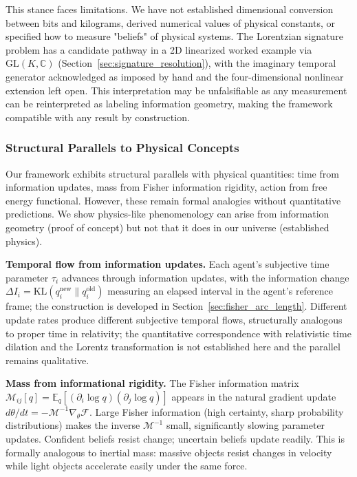 \documentclass[11pt]{article}
\begin{document}
This stance faces limitations. We have not established dimensional conversion between bits and kilograms, derived numerical values of physical constants, or specified how to measure "beliefs" of physical systems. The Lorentzian signature problem has a candidate pathway in a 2D linearized worked example via $\mathrm{GL}(K, \mathbb{C})$ (Section~\ref{sec:signature_resolution}), with the imaginary temporal generator acknowledged as imposed by hand and the four-dimensional nonlinear extension left open. This interpretation may be unfalsifiable as any measurement can be reinterpreted as labeling information geometry, making the framework compatible with any result by construction.

\subsubsection{Structural Parallels to Physical Concepts}

Our framework exhibits structural parallels with physical quantities: time from information updates, mass from Fisher information rigidity, action from free energy functional. However, these remain formal analogies without quantitative predictions. We show physics-like phenomenology can arise from information geometry (proof of concept) but not that it does in our universe (established physics).

\textbf{Temporal flow from information updates.} Each agent's subjective time parameter $\tau_i$ advances through information updates, with the information change $\Delta I_i = \mathrm{KL}(q_i^{\text{new}} \| q_i^{\text{old}})$ measuring an elapsed interval in the agent's reference frame; the construction is developed in Section~\ref{sec:fisher_arc_length}. Different update rates produce different subjective temporal flows, structurally analogous to proper time in relativity; the quantitative correspondence with relativistic time dilation and the Lorentz transformation is not established here and the parallel remains qualitative.

\textbf{Mass from informational rigidity.} The Fisher information matrix $\mathcal{M}_{ij}[q] = \mathbb{E}_{q}[(\partial_i \log q)(\partial_j \log q)]$ appears in the natural gradient update $d\theta/dt = -\mathcal{M}^{-1} \nabla_\theta \mathcal{F}$. Large Fisher information (high certainty, sharp probability distributions) makes the inverse $\mathcal{M}^{-1}$ small, significantly slowing parameter updates. Confident beliefs resist change; uncertain beliefs update readily. This is formally analogous to inertial mass: massive objects resist changes in velocity while light objects accelerate easily under the same force.
\end{document}
